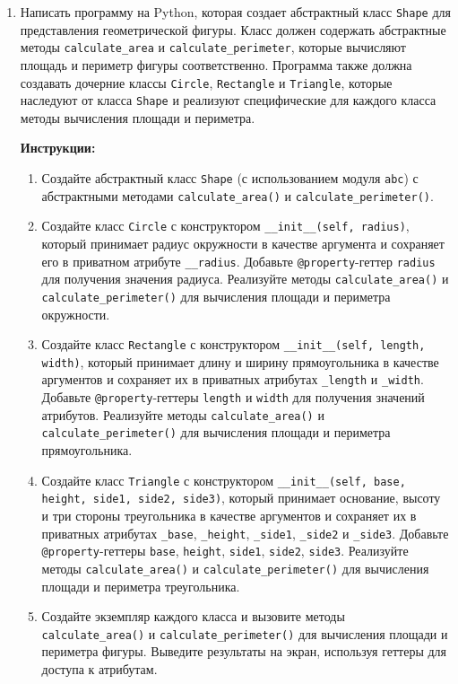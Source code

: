 

\begin{enumerate}
    \item 

    Написать программу на Python, которая создает абстрактный класс \texttt{Shape} для представления геометрической фигуры. 
Класс должен содержать абстрактные методы \texttt{calculate\_area} и \texttt{calculate\_perimeter}, 
которые вычисляют площадь и периметр фигуры соответственно. 
Программа также должна создавать дочерние классы \texttt{Circle}, \texttt{Rectangle} и \texttt{Triangle}, 
которые наследуют от класса \texttt{Shape} и реализуют специфические для каждого класса методы вычисления площади и периметра.

\textbf{Инструкции:}
\begin{enumerate}
    \item Создайте абстрактный класс \texttt{Shape} (с использованием модуля \texttt{abc}) с абстрактными методами 
    \texttt{calculate\_area()} и \texttt{calculate\_perimeter()}.
    \item Создайте класс \texttt{Circle} с конструктором \texttt{\_\_init\_\_(self, radius)}, 
    который принимает радиус окружности в качестве аргумента и сохраняет его в приватном атрибуте \texttt{\_\_radius}.  
    Добавьте \texttt{@property}-геттер \texttt{radius} для получения значения радиуса.  
    Реализуйте методы \texttt{calculate\_area()} и \texttt{calculate\_perimeter()} для вычисления площади и периметра окружности.
    \item Создайте класс \texttt{Rectangle} с конструктором \texttt{\_\_init\_\_(self, length, width)}, 
    который принимает длину и ширину прямоугольника в качестве аргументов и сохраняет их в приватных атрибутах 
    \texttt{\_length} и \texttt{\_width}.  
    Добавьте \texttt{@property}-геттеры \texttt{length} и \texttt{width} для получения значений атрибутов.  
    Реализуйте методы \texttt{calculate\_area()} и \texttt{calculate\_perimeter()} для вычисления площади и периметра прямоугольника.
    \item Создайте класс \texttt{Triangle} с конструктором \texttt{\_\_init\_\_(self, base, height, side1, side2, side3)}, 
    который принимает основание, высоту и три стороны треугольника в качестве аргументов и сохраняет их в приватных атрибутах 
    \texttt{\_base}, \texttt{\_height}, \texttt{\_side1}, \texttt{\_side2} и \texttt{\_side3}.  
    Добавьте \texttt{@property}-геттеры \texttt{base}, \texttt{height}, \texttt{side1}, \texttt{side2}, \texttt{side3}.  
    Реализуйте методы \texttt{calculate\_area()} и \texttt{calculate\_perimeter()} для вычисления площади и периметра треугольника.
    \item Создайте экземпляр каждого класса и вызовите методы \texttt{calculate\_area()} и \texttt{calculate\_perimeter()} 
    для вычисления площади и периметра фигуры. Выведите результаты на экран, используя геттеры для доступа к атрибутам.
\end{enumerate}


\end{enumerate}
